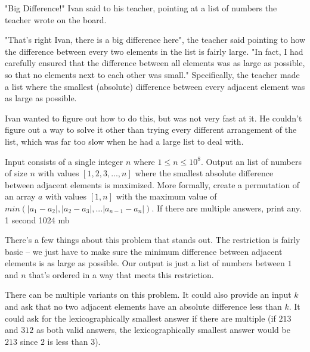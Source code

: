 {"Big Difference!" Ivan said to his teacher, pointing at a list of numbers the teacher wrote on the board.

"That's right Ivan, there is a big difference here", the teacher said pointing to how the difference between every two elements in the list is fairly large. "In fact, I had carefully ensured that the difference between all elements was as large as possible, so that no elements next to each other was small." Specifically, the teacher made a list where the smallest (absolute) difference between every adjacent element was as large as possible.

Ivan wanted to figure out how to do this, but was not very fast at it. He couldn't figure out a way to solve it other than trying every different arrangement of the list, which was far too slow when he had a large list to deal with.}
{Input consists of a single integer $n$ where $1 \le n \le 10^8$.}
{Output an list of numbers of size $n$ with values $[1,2,3,...,n]$ where the smallest absolute difference between adjacent elements is maximized. More formally, create a permutation of an array $a$ with values $[1,n]$ with the maximum value of $min(|a_1-a_2|, |a_2-a_3|, ... |a_{n-1}-a_{n}|)$. If there are multiple answers, print any.}
{1 second}
{1024 mb}
{
}

\hrulefill

There's a few things about this problem that stands out. The restriction is fairly basic -- we just have to make sure the minimum difference between adjacent elements is as large as possible. Our output is just a list of numbers between $1$ and $n$ that's ordered in a way that meets this restriction.

There can be multiple variants on this problem. It could also provide an input $k$ and ask that no two adjacent elements have an absolute difference less than $k$. It could ask for the lexicographically smallest answer if there are multiple (if $2 1 3$ and $3 1 2$ as both valid answers, the lexicographically smallest answer would be $2 1 3$ since $2$ is less than $3$).